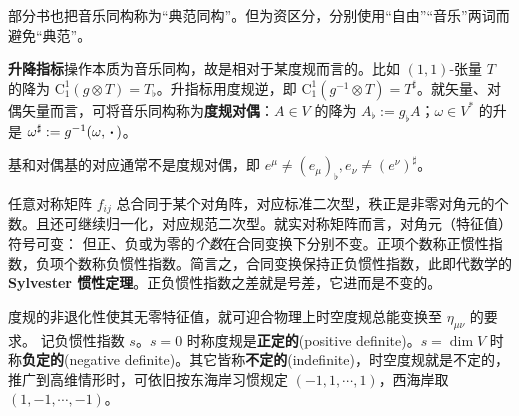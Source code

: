 \begin{remark}
    部分书也把音乐同构称为“典范同构”。但为资区分，分别使用“自由”“音乐”两词而避免“典范”。
\end{remark}

\begin{definition}
    \textbf{升降指标}操作本质为音乐同构，故是相对于某度规而言的。比如 $(1,1)$-张量 $T$ 的降为
    $\mathrm{C}_1^1(g\otimes T)=T_\flat$。升指标用度规逆，即 $\mathrm{C}_1^1(g^{-1}\otimes T)=T^\sharp$。就矢量、对偶矢量而言，可将音乐同构称为\textbf{度规对偶}：$A\in V$ 的降为 $A_\flat:=g_\flat A$；$\omega\in V^*$ 的升是 $\omega^\sharp:=g^{-1}(\omega,\oo)$。
\end{definition}

\begin{remark}
    基和对偶基的对应通常不是度规对偶，即 $e^\mu\ne (e_\mu)_\flat, e_\nu\ne (e^\nu)^\sharp$。
\end{remark}

任意对称矩阵 $f_{ij}$ 总合同于某个对角阵，对应标准二次型，秩正是非零对角元的个数。且还可继续归一化，对应规范二次型。就实对称矩阵而言，对角元（特征值）符号可变：
但正、负或为零的\textit{个数}在合同变换下分别不变。正项个数称正惯性指数，负项个数称负惯性指数。简言之，合同变换保持正负惯性指数，此即代数学的 \textbf{Sylvester 惯性定理}。正负惯性指数之差就是号差，它进而是不变的。

度规的非退化性使其无零特征值，就可迎合物理上时空度规总能变换至 $\eta_{\mu\nu}$ 的要求。
记负惯性指数 $s$。$s=0$ 时称度规是\textbf{正定的}(positive definite)。$s=\dim V$ 时称\textbf{负定的}(negative definite)。其它皆称\textbf{不定的}(indefinite)，时空度规就是不定的，推广到高维情形时，可依旧按东海岸习惯规定 $(-1,1,\cdots,1)$，西海岸取 $(1,-1,\cdots,-1)$。

